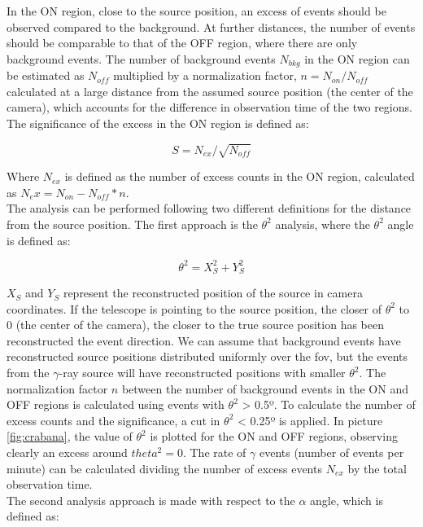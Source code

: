 \documentclass[main.tex]{subfiles}
\begin{document}
In the ON region, close to the source position, an excess of events should be observed compared to the background. At further distances, the number of events should be comparable to that of the OFF region, where there are only background events. The number of background events $N_{bkg}$ in the ON region can be estimated as $N_{off}$ multiplied by a normalization factor, $n = N_{on}/N_{off}$ calculated at a large distance from the assumed source position (the center of the camera), which accounts for the difference in observation time of the two regions. The significance of the excess in the ON region is defined as: 

\begin{equation}
  S = N_{ex}/\sqrt{N_{off}}
\end{equation}

Where $N_{ex}$ is defined as the number of excess counts in the ON region, calculated as $N_ex=N_{on}-N_{off} * n$. \\
The analysis can be performed following two different definitions for the distance from the source position. The first approach is the $\theta^2$ analysis, where the $\theta^2$ angle is defined as:

\begin{equation}
  \theta^2 = X_{S}^2 + Y_{S}^2 
\end{equation}

$X_{S}$ and $Y_{S}$ represent the reconstructed position of the source in camera coordinates. If the telescope is pointing to the source position, the closer of $\theta^2$ to 0 (the center of the camera), the closer to the true source position has been reconstructed the event direction. We can assume that background events have reconstructed source positions distributed uniformly over the \gls{fov}, but the events from the $\gamma$-ray source will have reconstructed positions with smaller $\theta^2$. The normalization factor $n$ between the number of background events in the ON and OFF regions is calculated using events with $\theta^2$ > 0.5º. To calculate the number of excess counts and the significance, a cut in $\theta^2$ < 0.25º is applied. In picture \ref{fig:crabana}, the value of $\theta^2$ is plotted for the ON and OFF regions, observing clearly an excess around $theta^2=0$. The rate of $\gamma$ events (number of events per minute) can be calculated dividing the number of excess events $N_{ex}$ by the total observation time.\\

The second analysis approach is made with respect to the $\alpha$ angle, which is defined as:
\end{document}
